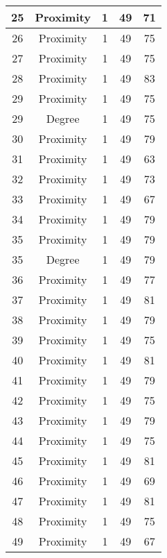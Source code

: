 \documentclass[results.tex]{subfiles}
\begin{document}
\begin{center}
\begin{tabular}{| c || c | c | c | c |}
    \hline
    25 & Proximity & 1 & 49 & 71 \\ 
    \hline
    26 & Proximity & 1 & 49 & 75 \\ 
    \hline
    27 & Proximity & 1 & 49 & 75 \\ 
    \hline
    28 & Proximity & 1 & 49 & 83 \\ 
    \hline
    29 & Proximity & 1 & 49 & 75 \\ 
    \hline
    29 & Degree & 1 & 49 & 75 \\ 
    \hline
    30 & Proximity & 1 & 49 & 79 \\ 
    \hline
    31 & Proximity & 1 & 49 & 63 \\ 
    \hline
    32 & Proximity & 1 & 49 & 73 \\ 
    \hline
    33 & Proximity & 1 & 49 & 67 \\ 
    \hline
    34 & Proximity & 1 & 49 & 79 \\ 
    \hline
    35 & Proximity & 1 & 49 & 79 \\ 
    \hline
    35 & Degree & 1 & 49 & 79 \\ 
    \hline
    36 & Proximity & 1 & 49 & 77 \\ 
    \hline
    37 & Proximity & 1 & 49 & 81 \\ 
    \hline
    38 & Proximity & 1 & 49 & 79 \\ 
    \hline
    39 & Proximity & 1 & 49 & 75 \\ 
    \hline
    40 & Proximity & 1 & 49 & 81 \\ 
    \hline
    41 & Proximity & 1 & 49 & 79 \\ 
    \hline
    42 & Proximity & 1 & 49 & 75 \\ 
    \hline
    43 & Proximity & 1 & 49 & 79 \\ 
    \hline
    44 & Proximity & 1 & 49 & 75 \\ 
    \hline
    45 & Proximity & 1 & 49 & 81 \\ 
    \hline
    46 & Proximity & 1 & 49 & 69 \\ 
    \hline
    47 & Proximity & 1 & 49 & 81 \\ 
    \hline
    48 & Proximity & 1 & 49 & 75 \\ 
    \hline
    49 & Proximity & 1 & 49 & 67 \\ 
    \hline   \end{tabular}
\end{center}
\end{document}

